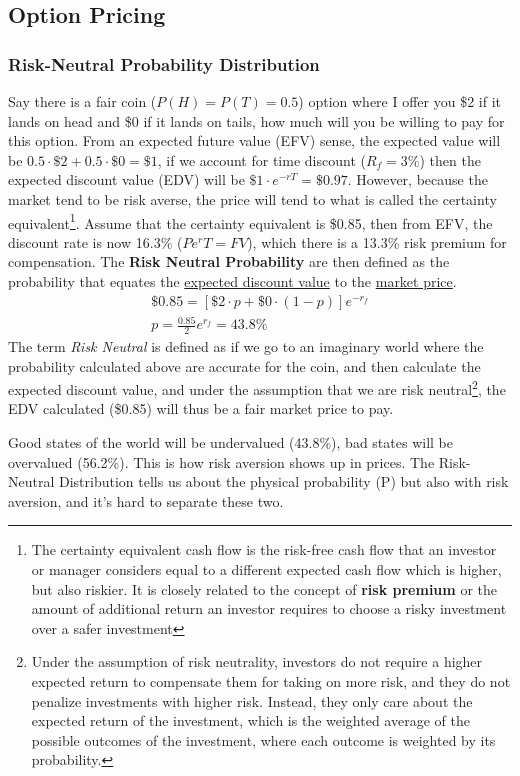 \begin{multicols}{2}
\subsection{Option Pricing}
\subsubsection{Risk-Neutral Probability Distribution}
Say there is a fair coin ($P(H)=P(T)=0.5$) option where I offer you \$2 if it lands on head and \$0 if it lands on tails, how much will you be willing to pay for this option. From an expected future value (EFV) sense, the expected value will be $0.5\cdot\$2+0.5\cdot\$0 = \$1$, if we account for time discount ($R_f = 3\%$) then the expected discount value (EDV) will be $\$1\cdot e^{-rT} = \$0.97$. However, because the market tend to be risk averse, the price will tend to what is called the certainty equivalent\footnote{The certainty equivalent cash flow is the risk-free cash flow that an investor or manager considers equal to a different expected cash flow which is higher, but also riskier. It is closely related to the concept of \textbf{risk premium} or the amount of additional return an investor requires to choose a risky investment over a safer investment}. Assume that the certainty equivalent is \$0.85, then from EFV, the discount rate is now 16.3\% ($Pe^rT = FV$), which there is a 13.3\% risk premium for compensation. The \textbf{Risk Neutral Probability} are then defined as the probability that equates the \underline{expected discount value} to the \underline{market price}. 
\begin{gather*}
    \$0.85 = [\$2\cdot p+\$0\cdot(1-p)]e^{-r_f}\\
    p = \frac{0.85}{2}e^{r_f} = 43.8\%
\end{gather*}
The term \textit{Risk Neutral} is defined as if we go to an imaginary world where the probability calculated above are accurate for the coin, and then calculate the expected discount value, and under the assumption that we are risk neutral\footnote{Under the assumption of risk neutrality, investors do not require a higher expected return to compensate them for taking on more risk, and they do not penalize investments with higher risk. Instead, they only care about the expected return of the investment, which is the weighted average of the possible outcomes of the investment, where each outcome is weighted by its probability.}, the EDV calculated (\$0.85) will thus be a fair market price to pay.

Good states of the world will be undervalued (43.8\%), bad states will be overvalued (56.2\%). This is how risk aversion shows up in prices. The Risk-Neutral Distribution tells us about the physical probability (P) but also with risk aversion, and it's hard to separate these two. 


\end{multicols}
